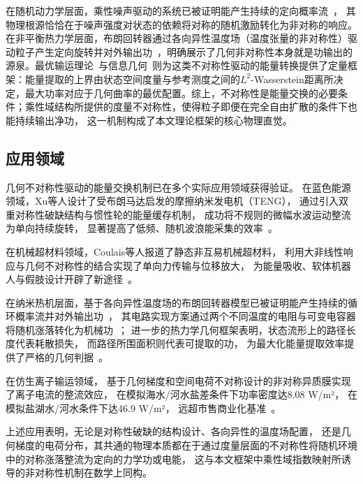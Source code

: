 ﻿\documentclass[10pt,a4paper]{article}
\numberwithin{equation}{section}
\begin{document}
在随机动力学层面，乘性噪声驱动的系统已被证明能产生持续的定向概率流~\cite{Volpe2014Brownian, Lindner2001Brownian}，
其物理根源恰恰在于噪声强度对状态的依赖将对称的随机激励转化为非对称的响应。
在非平衡热力学层面，布朗回转器通过各向异性温度场（温度张量的非对称性）驱动粒子产生定向旋转并对外输出功~\cite{Filippetti2021Brownian, Sasa2014Stochastic}，明确展示了几何非对称性本身就是功输出的源泉。最优输运理论~\cite{Villani2009Optimal}与信息几何~\cite{Amari2016}则为这类不对称性驱动的能量转换提供了定量框架：能量提取的上界由状态空间度量与参考测度之间的$L^2$-Wasserstein距离所决定，最大功率对应于几何曲率的最优配置。综上，不对称性是能量交换的必要条件；乘性域结构所提供的度量不对称性，使得粒子即便在完全自由扩散的条件下也能持续输出净功，
这一机制构成了本文理论框架的核心物理直觉。

\subsection{应用领域}

几何不对称性驱动的能量交换机制已在多个实际应用领域获得验证。
在蓝色能源领域，Xu等人设计了受布朗马达启发的摩擦纳米发电机（TENG），
通过引入双重对称性破缺结构与惯性轮的能量缓存机制，
成功将不规则的微幅水波运动整流为单向持续旋转，
显著提高了低频、随机波浪能采集的效率~\cite{Xu2023Brownian}。

在机械超材料领域，Coulais等人报道了静态非互易机械超材料，
利用大非线性响应与几何不对称性的结合实现了单向力传输与位移放大，
为能量吸收、软体机器人与假肢设计开辟了新途径~\cite{Coulais2017Static}。

在纳米热机层面，基于各向异性温度场的布朗回转器模型已被证明能产生持续的循环概率流并对外输出功~\cite{Filippetti2021Brownian, Sasa2014Stochastic}，
其电路实现方案通过两个不同温度的电阻与可变电容器将随机涨落转化为机械功~\cite{Argun2020Brownian}；
进一步的热力学几何框架表明，状态流形上的路径长度代表耗散损失，
而路径所围面积则代表可提取的功，
为最大化能量提取效率提供了严格的几何判据~\cite{Bruers2007Brownian}。

在仿生离子输运领域，
基于几何梯度和空间电荷不对称设计的非对称异质膜实现了离子电流的整流效应，
在模拟海水/河水盐差条件下功率密度达8.08 W/m²，
在模拟盐湖水/河水条件下达46.9 W/m²，
远超市售商业化基准~\cite{Zhang2021Asymmetric}。

上述应用表明，无论是对称性破缺的结构设计、各向异性的温度场配置，
还是几何梯度的电荷分布，其共通的物理本质都在于通过度量层面的不对称性将随机环境中的对称涨落整流为定向的力学功或电能，
这与本文框架中乘性域指数映射所诱导的非对称性机制在数学上同构。

\printbibliography
\end{document}

